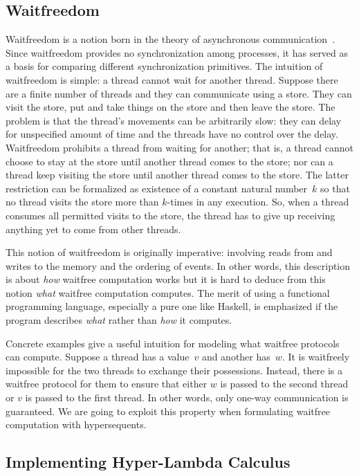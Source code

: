 \subsection{Waitfreedom}
\label{subsect:wf}

Waitfreedom is a notion born in the theory of asynchronous
communication~\citep{lamport1979make,Herlihy99,Saks:1993vq}. Since
waitfreedom provides no synchronization among processes, it has
served as a basis for comparing different synchronization primitives.
The intuition of waitfreedom is simple: a thread cannot
wait for another thread.  Suppose there are a finite number of threads and they can
communicate using a store. They can
visit the store, put and take things on the store and then leave the
store. The problem is that the thread's movements can be arbitrarily
slow: they can delay for unspecified amount of time and the threads
have no control over the delay. Waitfreedom prohibits a thread from
waiting for another; that is, a thread cannot choose to stay at the
store until another thread comes to the store; nor can a thread
keep visiting the store until another thread comes to the store.  The
latter restriction can be formalized as existence of a constant natural
number~$k$ so
that no thread visits the store more than
$k$-times in any execution.  So, when a thread consumes all permitted
visits to the store, the thread has to give up receiving anything yet to come
from other threads.

This notion of waitfreedom is originally imperative: involving reads from and writes to
the memory and the ordering of events.  In other words, this description
is about
\textit{how} waitfree computation works but it is hard to deduce from
this notion \textit{what} waitfree computation computes.
The merit of using a functional programming language, especially a pure
one like Haskell, is emphasized if the program describes \textit{what}
rather than \textit{how} it computes.

Concrete examples give a useful intuition for modeling what waitfree
protocols can compute.
Suppose a thread has a value~$v$ and another has~$w$.
It is waitfreely impossible for the two threads to exchange their
possessions.  Instead, there is a waitfree protocol for them to ensure
that either $w$ is passed to the second thread or $v$ is passed to the
first thread.
In other words, only one-way communication is guaranteed.  We are going
to exploit this property when formulating waitfree computation with hypersequents.


\subsection{Implementing Hyper-Lambda Calculus}

